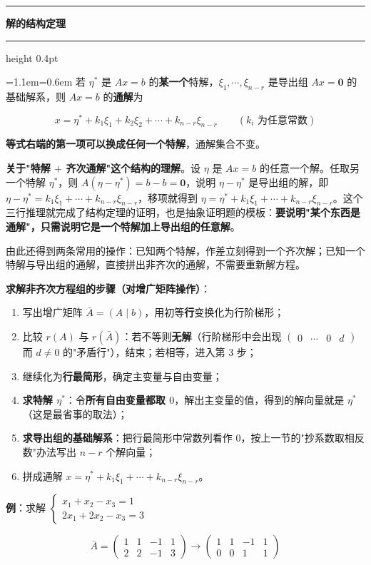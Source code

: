 \documentclass[11pt,openany,UTF8]{ctexbook}
\newcommand{\callouthead}[2]{%
  \par\addvspace{7pt}\noindent
  {\color{#1}\rule[-0.15em]{3pt}{1.05em}}\hspace{0.5em}%
  {\bfseries\color{#1}#2}\par\nobreak\vspace{-0.35em}%
  {\color{rulesep}\hrule height 0.4pt}\nobreak\vspace{0.45em}%
  \begingroup\small\setlength{\parindent}{0pt}%
  \leftskip=1.1em\rightskip=0.6em\noindent\ignorespaces}
\newcommand{\calloutend}{\par\endgroup\addvspace{7pt}}
\newenvironment{callkey}[1]{\callouthead{keybar}{#1}}{\calloutend}
\begin{document}
\begin{callkey}{解的结构定理}
若 $\eta^*$ 是 $Ax=b$ 的\textbf{某一个}特解，$\xi_1,\cdots,\xi_{n-r}$ 是导出组 $Ax=\mathbf{0}$ 的基础解系，则 $Ax=b$ 的\textbf{通解}为

\[x=\eta^*+k_1\xi_1+k_2\xi_2+\cdots+k_{n-r}\xi_{n-r}\qquad(k_i\text{ 为任意常数})\]

\textbf{等式右端的第一项可以换成任何一个特解}，通解集合不变。

\end{callkey}

\textbf{关于"特解 $+$ 齐次通解"这个结构的理解}。设 $\eta$ 是 $Ax=b$ 的任意一个解。任取另一个特解 $\eta^*$，则 $A(\eta-\eta^*)=b-b=\mathbf{0}$，说明 $\eta-\eta^*$ 是导出组的解，即 $\eta-\eta^*=k_1\xi_1+\cdots+k_{n-r}\xi_{n-r}$，移项就得到 $\eta=\eta^*+k_1\xi_1+\cdots+k_{n-r}\xi_{n-r}$。这个三行推理就完成了结构定理的证明，也是抽象证明题的模板：\textbf{要说明"某个东西是通解"，只需说明它是一个特解加上导出组的任意解}。

由此还得到两条常用的操作：已知两个特解，作差立刻得到一个齐次解；已知一个特解与导出组的通解，直接拼出非齐次的通解，不需要重新解方程。

\textbf{求解非齐次方程组的步骤（对增广矩阵操作）}：

\begin{enumerate}
\item 写出增广矩阵 $\bar A=(A\mid b)$，用初等\textbf{行}变换化为行阶梯形；
\item 比较 $r(A)$ 与 $r(\bar A)$：若不等则\textbf{无解}（行阶梯形中会出现 $\begin{pmatrix}0&\cdots&0&d\end{pmatrix}$ 而 $d\ne0$ 的"矛盾行"），结束；若相等，进入第 3 步；
\item 继续化为\textbf{行最简形}，确定主变量与自由变量；
\item \textbf{求特解 $\eta^*$}：令\textbf{所有自由变量都取 $0$}，解出主变量的值，得到的解向量就是 $\eta^*$（这是最省事的取法）；
\item \textbf{求导出组的基础解系}：把行最简形中常数列看作 $0$，按上一节的"抄系数取相反数"办法写出 $n-r$ 个解向量；
\item 拼成通解 $x=\eta^*+k_1\xi_1+\cdots+k_{n-r}\xi_{n-r}$。
\end{enumerate}
\textbf{例}：求解 $\begin{cases} x_1+x_2-x_3=1 \\ 2x_1+2x_2-x_3=3 \end{cases}$

\[\bar A=\begin{pmatrix} 1 & 1 & -1 & 1 \\ 2 & 2 & -1 & 3 \end{pmatrix}
\longrightarrow\begin{pmatrix} 1 & 1 & -1 & 1 \\ 0 & 0 & 1 & 1 \end{pmatrix}\]
\end{document}
